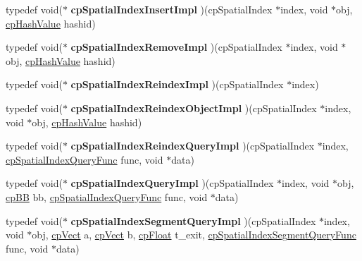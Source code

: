 \begin{DoxyCompactItemize}
\item 
\hypertarget{group__cp_spatial_index_ga1e49088eb0867791e526f1f36aea6d3e}{typedef void($\ast$ {\bfseries cp\-Spatial\-Index\-Insert\-Impl} )(cp\-Spatial\-Index $\ast$index, void $\ast$obj, \hyperlink{group__basic_types_gae7eb4775a9f43914a15553ca65a048f4}{cp\-Hash\-Value} hashid)}\label{group__cp_spatial_index_ga1e49088eb0867791e526f1f36aea6d3e}

\item 
\hypertarget{group__cp_spatial_index_gafcf1118118f457fa594005fb0bdcfecd}{typedef void($\ast$ {\bfseries cp\-Spatial\-Index\-Remove\-Impl} )(cp\-Spatial\-Index $\ast$index, void $\ast$obj, \hyperlink{group__basic_types_gae7eb4775a9f43914a15553ca65a048f4}{cp\-Hash\-Value} hashid)}\label{group__cp_spatial_index_gafcf1118118f457fa594005fb0bdcfecd}

\item 
\hypertarget{group__cp_spatial_index_gabe64d4270a840d54660fc675ca6d7f97}{typedef void($\ast$ {\bfseries cp\-Spatial\-Index\-Reindex\-Impl} )(cp\-Spatial\-Index $\ast$index)}\label{group__cp_spatial_index_gabe64d4270a840d54660fc675ca6d7f97}

\item 
\hypertarget{group__cp_spatial_index_gacdf38962ca5145c824fdd129b3656edf}{typedef void($\ast$ {\bfseries cp\-Spatial\-Index\-Reindex\-Object\-Impl} )(cp\-Spatial\-Index $\ast$index, void $\ast$obj, \hyperlink{group__basic_types_gae7eb4775a9f43914a15553ca65a048f4}{cp\-Hash\-Value} hashid)}\label{group__cp_spatial_index_gacdf38962ca5145c824fdd129b3656edf}

\item 
\hypertarget{group__cp_spatial_index_ga4dce3afee4461d9883b2149960ad1d34}{typedef void($\ast$ {\bfseries cp\-Spatial\-Index\-Reindex\-Query\-Impl} )(cp\-Spatial\-Index $\ast$index, \hyperlink{group__cp_spatial_index_ga4885d6b7a5f9f613a19a25e1c7ec5073}{cp\-Spatial\-Index\-Query\-Func} func, void $\ast$data)}\label{group__cp_spatial_index_ga4dce3afee4461d9883b2149960ad1d34}

\item 
\hypertarget{group__cp_spatial_index_ga021ab254980a1612b736b2d8eea33ce9}{typedef void($\ast$ {\bfseries cp\-Spatial\-Index\-Query\-Impl} )(cp\-Spatial\-Index $\ast$index, void $\ast$obj, \hyperlink{structcp_b_b}{cp\-B\-B} bb, \hyperlink{group__cp_spatial_index_ga4885d6b7a5f9f613a19a25e1c7ec5073}{cp\-Spatial\-Index\-Query\-Func} func, void $\ast$data)}\label{group__cp_spatial_index_ga021ab254980a1612b736b2d8eea33ce9}

\item 
\hypertarget{group__cp_spatial_index_gaa404b0c1f4096be47dc4cde3a7eede7e}{typedef void($\ast$ {\bfseries cp\-Spatial\-Index\-Segment\-Query\-Impl} )(cp\-Spatial\-Index $\ast$index, void $\ast$obj, \hyperlink{structcp_vect}{cp\-Vect} a, \hyperlink{structcp_vect}{cp\-Vect} b, \hyperlink{group__basic_types_gac1ed65573e035bf892505768c852d8d3}{cp\-Float} t\-\_\-exit, \hyperlink{group__cp_spatial_index_ga60396867350f1f81025575e825ec852f}{cp\-Spatial\-Index\-Segment\-Query\-Func} func, void $\ast$data)}\label{group__cp_spatial_index_gaa404b0c1f4096be47dc4cde3a7eede7e}

\end{DoxyCompactItemize}
